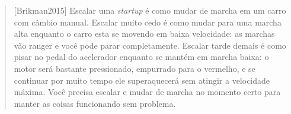 \begin{quotation}[Brikman2015]
    Escalar uma \textit{startup} é como mudar de marcha em um carro com câmbio manual.
    Escalar muito cedo é como mudar para uma marcha alta enquanto o carro esta se movendo
    em baixa velocidade: as marchas vão ranger e você pode parar completamente. Escalar
    tarde demais é como pisar no pedal do acelerador enquanto se mantém em marcha baixa:
    o motor será bastante pressionado, empurrado para o vermelho, e se continuar por muito
    tempo ele superaquecerá sem atingir a velocidade máxima. Você precisa escalar e mudar
    de marcha no momento certo para manter as coisas funcionando sem problema.
\end{quotation}
